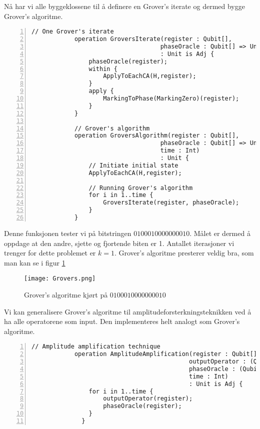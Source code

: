         Nå har vi alle byggeklossene til å definere en Grover's iterate og dermed bygge Grover's algoritme.

        \begin{Verbatim}[gobble=2, numbers=left, frame=lines,
            framesep=3mm,
            label={[Beginning of code]End of code}]
            // One Grover's iterate
            operation GroversIterate(register : Qubit[], 
                                    phaseOracle : Qubit[] => Unit is Adj) 
                                    : Unit is Adj {
                phaseOracle(register);
                within {
                    ApplyToEachCA(H,register);
                }
                apply {
                    MarkingToPhase(MarkingZero)(register);
                }
            }

            // Grover's algorithm
            operation GroversAlgorithm(register : Qubit[], 
                                    phaseOracle : Qubit[] => Unit is Adj, 
                                    time : Int) 
                                    : Unit {
                // Initiate initial state
                ApplyToEachCA(H,register);

                // Running Grover's algorithm
                for i in 1..time {
                    GroversIterate(register, phaseOracle);
                }
            }
        \end{Verbatim}

        Denne funksjonen tester vi på bitstringen $0100010000000010$. Målet er dermed å oppdage at den andre, sjette og fjortende biten er 1. Antallet iterasjoner vi trenger for dette problemet er $k = 1$. Grover's algoritme presterer veldig bra, som man kan se i figur \ref{fig:Grover's}

        \begin{figure}
            \begin{center}
                \caption{Grover's algoritme kjørt på $0100010000000010$}
                \texttt{[image: Grovers.png]}
                \label{fig:Grover's}
            \end{center}
        \end{figure}

        Vi kan generalisere Grover's algoritme til amplitudeforsterkningsteknikken ved å ha alle operatorene som input. Den implementeres helt analogt som Grover's algoritme.

        \begin{Verbatim}[gobble=2, numbers=left, frame=lines,
            framesep=3mm,
            label={[Beginning of code]End of code}]
            // Amplitude amplification technique
            operation AmplitudeAmplification(register : Qubit[], 
                                            outputOperator : (Qubit[] => Unit is Adj), 
                                            phaseOracle : (Qubit[] => Unit is Adj), 
                                            time : Int) 
                                            : Unit is Adj {
                for i in 1..time {
                    outputOperator(register);
                    phaseOracle(register);
                }
              }
        \end{Verbatim}

